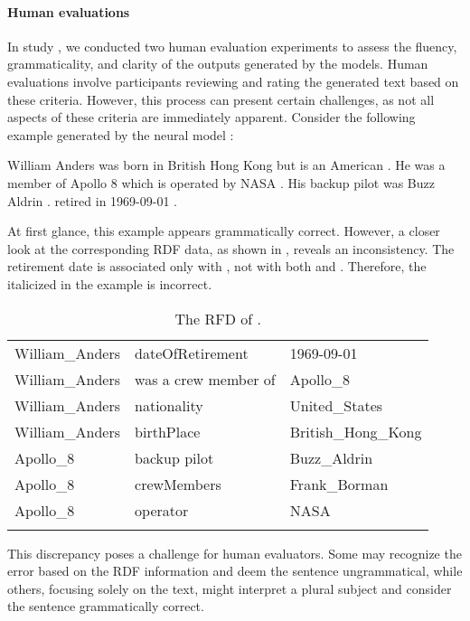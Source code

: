\paragraph*{Human evaluations}

In study \studF, we conducted two human evaluation experiments to assess the fluency, grammaticality, and clarity of the outputs generated by the models. Human evaluations involve participants reviewing and rating the generated text based on these criteria. However, this process can present certain challenges, as not all aspects of these criteria are immediately apparent. Consider the following example generated by the neural model :

\begin{exe}
	\ex\label{ex:william} William Anders was born in British Hong Kong but is an American . He was a member of Apollo 8 which is operated by NASA . His backup pilot was Buzz Aldrin .  retired in 1969-09-01 .
\end{exe}

At first glance, this example appears grammatically correct. However, a closer look at the corresponding RDF data, as shown in , reveals an inconsistency. The retirement date is associated only with , not with both  and . Therefore, the italicized  in the example is incorrect.

\begin{table}
	\begin{tabular}{lll}
		\lsptoprule
		William\_Anders & dateOfRetirement & 1969-09-01 \\
		William\_Anders & was a crew member of & Apollo\_8 \\
		William\_Anders & nationality & United\_States \\
		William\_Anders & birthPlace & British\_Hong\_Kong \\
		Apollo\_8 & backup pilot & Buzz\_Aldrin \\
		Apollo\_8 & crewMembers & Frank\_Borman \\
		Apollo\_8 & operator & NASA\\
		\lspbottomrule
	\end{tabular}
	\caption{The RFD of .}\label{tab:william}
\end{table}

This discrepancy poses a challenge for human evaluators. Some may recognize the error based on the RDF information and deem the sentence ungrammatical, while others, focusing solely on the text, might interpret a plural subject and consider the sentence grammatically correct.

